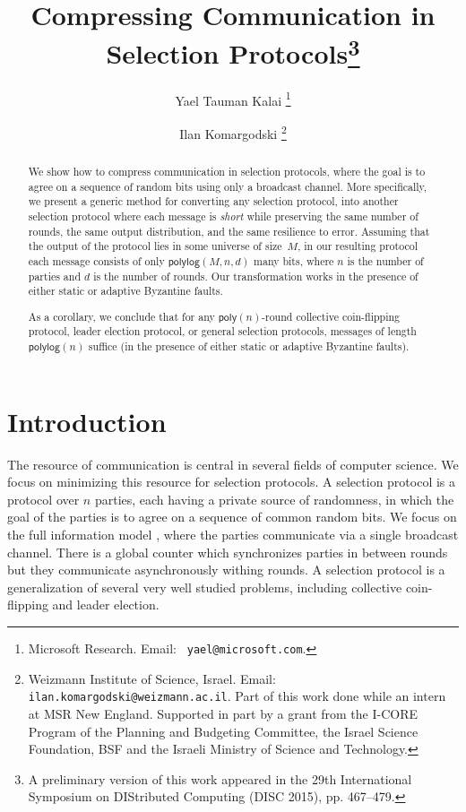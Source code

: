 \documentclass[11pt]{article}
\title{Compressing Communication in Selection Protocols\footnote{A preliminary
    version of this work appeared in the 29th International Symposium on
    DIStributed Computing (DISC 2015), pp. 467--479.}}
\author{Yael Tauman Kalai \thanks{Microsoft Research. Email: {\tt
      yael@microsoft.com}.}
\and
Ilan Komargodski \thanks{Weizmann Institute of Science, Israel. Email: {\tt
      ilan.komargodski@weizmann.ac.il}. Part of this work done while an intern
    at MSR New England. Supported in part by a grant from the I-CORE Program of
    the Planning and Budgeting Committee, the Israel Science Foundation, BSF and
    the Israeli Ministry of Science and Technology.  } }
\date{}
\theoremstyle{plain}
\theoremstyle{definition}
\numberwithin{equation}{section}
\numberwithin{equation}{section} \newcommand{\aka} {also known as\ }
\newcommand{\1}{\mathbf{1}}
\newcommand{\poly}{{\mathsf{poly}}}
\newcommand{\polylog}{{\mathsf{polylog}}}
\theoremstyle{remark}
\begin{document}
\maketitle

\begin{abstract}
  We show how to compress communication in selection protocols, where the goal is to agree on a sequence of random bits using only a broadcast channel. More specifically, we present a generic method for converting any selection protocol, into another selection protocol where each message is {\em short} while preserving the same number of rounds, the same output distribution, and the same resilience to error. Assuming that the output of the protocol lies in some universe of size~$M$, in our resulting protocol each message consists of only $\polylog(M,n,d)$ many bits, where $n$ is the number of parties and $d$ is the number of rounds.  Our transformation works in the presence of either static or adaptive Byzantine faults.

  As a corollary, we conclude that for any $\poly(n)$-round collective coin-flipping protocol, leader election protocol, or general selection protocols, messages of length $\polylog(n)$ suffice (in the presence of either static or adaptive Byzantine faults).

  \bigskip {}
\end{abstract}



\thispagestyle{empty}
\newpage \setcounter{page}{1}

\section{Introduction}
The resource of communication is central in several fields of computer
science. We focus on minimizing this resource for selection protocols. A
selection protocol is a protocol over $n$ parties, each having a private source
of randomness, in which the goal of the parties is to agree on a sequence of
common random bits. We focus on the full information model \cite{BenOrL85},
where the parties communicate via a single broadcast channel. There is a global
counter which synchronizes parties in between rounds but they communicate
asynchronously withing rounds.  A selection protocol is a generalization of
several very well studied problems, including collective coin-flipping and
leader election.  
\end{document}
